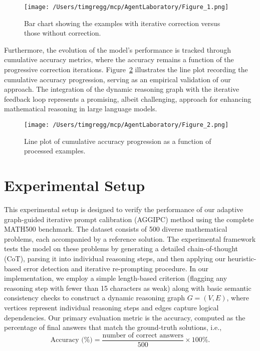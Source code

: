 \documentclass[11pt]{article}
\begin{document}
\begin{figure}[h]
\caption{Bar chart showing the examples with iterative correction versus those without correction.}
\centering
\texttt{[image: /Users/timgregg/mcp/AgentLaboratory/Figure\_1.png]}
\label{fig:fig1}
\end{figure}

Furthermore, the evolution of the model's performance is tracked through cumulative accuracy metrics, where the accuracy remains a function of the progressive correction iterations. Figure~\ref{fig:fig2} illustrates the line plot recording the cumulative accuracy progression, serving as an empirical validation of our approach. The integration of the dynamic reasoning graph with the iterative feedback loop represents a promising, albeit challenging, approach for enhancing mathematical reasoning in large language models.

\begin{figure}[h]
\caption{Line plot of cumulative accuracy progression as a function of processed examples.}
\centering
\texttt{[image: /Users/timgregg/mcp/AgentLaboratory/Figure\_2.png]}
\label{fig:fig2}
\end{figure}

\section{Experimental Setup}
This experimental setup is designed to verify the performance of our adaptive graph-guided iterative prompt calibration (AGGIPC) method using the complete MATH500 benchmark. The dataset consists of 500 diverse mathematical problems, each accompanied by a reference solution. The experimental framework tests the model on these problems by generating a detailed chain-of-thought (CoT), parsing it into individual reasoning steps, and then applying our heuristic-based error detection and iterative re-prompting procedure. In our implementation, we employ a simple length-based criterion (flagging any reasoning step with fewer than 15 characters as weak) along with basic semantic consistency checks to construct a dynamic reasoning graph \( G = (V, E) \), where vertices represent individual reasoning steps and edges capture logical dependencies. Our primary evaluation metric is the accuracy, computed as the percentage of final answers that match the ground-truth solutions, i.e., 
\[
\text{Accuracy (\%)} = \frac{\text{number of correct answers}}{500} \times 100\%.
\]
\end{document}
